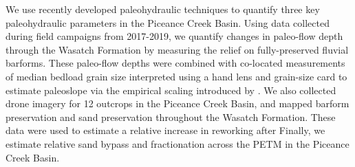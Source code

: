 \documentclass[draft]{compact_proposal}\usepackage[]{graphicx}\usepackage[]{color}
\begin{document}
We use recently developed paleohydraulic techniques to quantify three key paleohydraulic parameters in the Piceance Creek Basin.
Using data collected during field campaigns from 2017-2019, we quantify changes in paleo-flow depth through the Wasatch Formation by measuring the relief on fully-preserved fluvial barforms. 
These paleo-flow depths were combined with co-located measurements of median bedload grain size interpreted using a hand lens and grain-size card to estimate paleoslope via the empirical scaling introduced by \textcite{trampush_empirical_2014}.
We also collected drone imagery for 12 outcrops in the Piceance Creek Basin, and mapped barform preservation and sand preservation throughout the Wasatch Formation. 
These data were used to estimate a relative increase in reworking after \textcite{chamberlin_using_2019} 
Finally, we estimate relative sand bypass and fractionation across the PETM in the Piceance Creek Basin.
\end{document}
